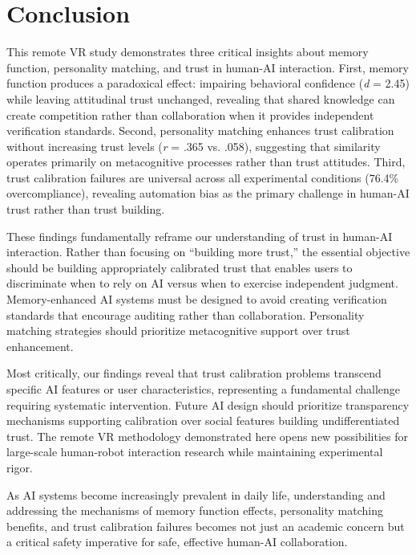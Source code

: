 \documentclass[12pt]{article}
\begin{document}
\section{Conclusion}

This remote VR study demonstrates three critical insights about memory function, personality matching, and trust in human-AI interaction. First, memory function produces a paradoxical effect: impairing behavioral confidence (\textit{d} = 2.45) while leaving attitudinal trust unchanged, revealing that shared knowledge can create competition rather than collaboration when it provides independent verification standards. Second, personality matching enhances trust calibration without increasing trust levels (\textit{r} = .365 vs. .058), suggesting that similarity operates primarily on metacognitive processes rather than trust attitudes. Third, trust calibration failures are universal across all experimental conditions (76.4\% overcompliance), revealing automation bias as the primary challenge in human-AI trust rather than trust building.

These findings fundamentally reframe our understanding of trust in human-AI interaction. Rather than focusing on ``building more trust,'' the essential objective should be building appropriately calibrated trust that enables users to discriminate when to rely on AI versus when to exercise independent judgment. Memory-enhanced AI systems must be designed to avoid creating verification standards that encourage auditing rather than collaboration. Personality matching strategies should prioritize metacognitive support over trust enhancement.

Most critically, our findings reveal that trust calibration problems transcend specific AI features or user characteristics, representing a fundamental challenge requiring systematic intervention. Future AI design should prioritize transparency mechanisms supporting calibration over social features building undifferentiated trust. The remote VR methodology demonstrated here opens new possibilities for large-scale human-robot interaction research while maintaining experimental rigor.

As AI systems become increasingly prevalent in daily life, understanding and addressing the mechanisms of memory function effects, personality matching benefits, and trust calibration failures becomes not just an academic concern but a critical safety imperative for safe, effective human-AI collaboration.



\end{document}
